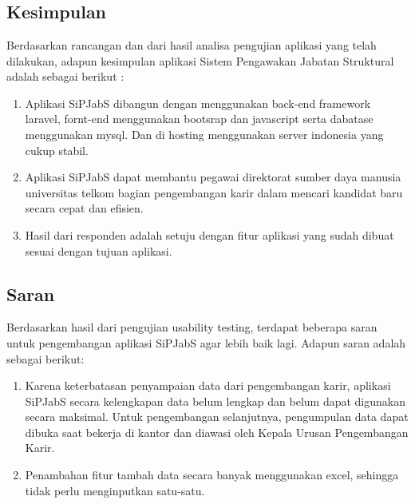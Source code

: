 \chapter{\babLima}

\section{Kesimpulan}
Berdasarkan rancangan dan dari hasil analisa pengujian aplikasi yang telah dilakukan, adapun kesimpulan aplikasi Sistem Pengawakan Jabatan Struktural adalah sebagai berikut :

\begin{enumerate}
	\item Aplikasi SiPJabS dibangun dengan menggunakan back-end framework laravel, fornt-end menggunakan bootsrap dan javascript serta dabatase menggunakan mysql. Dan di hosting menggunakan server indonesia yang cukup stabil.
	
	\item Aplikasi SiPJabS dapat membantu pegawai direktorat sumber daya manusia universitas telkom bagian pengembangan karir dalam mencari kandidat baru secara cepat dan efisien.
	
	\item Hasil dari responden adalah setuju dengan fitur aplikasi yang sudah
	dibuat sesuai dengan tujuan aplikasi.
	
\end{enumerate}


\section{Saran}
Berdasarkan hasil dari pengujian usability testing, terdapat beberapa saran untuk pengembangan aplikasi SiPJabS agar lebih baik lagi. Adapun saran adalah sebagai berikut:

\begin{enumerate}
	\item Karena keterbatasan penyampaian data dari pengembangan karir, aplikasi SiPJabS secara kelengkapan data belum lengkap dan belum dapat digunakan secara maksimal. Untuk pengembangan selanjutnya, pengumpulan data dapat dibuka saat bekerja di kantor dan diawasi oleh Kepala Urusan Pengembangan Karir.
	
	\item Penambahan fitur tambah data secara banyak menggunakan excel, sehingga tidak perlu menginputkan satu-satu.
\end{enumerate}
